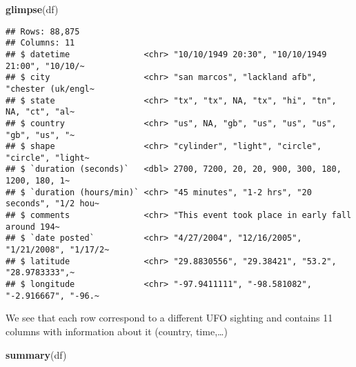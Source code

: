 \documentclass[
]{article}
\newenvironment{Shaded}{\begin{snugshade}}{\end{snugshade}}
\newcommand{\FunctionTok}[1]{\textcolor[rgb]{0.13,0.29,0.53}{\textbf{#1}}}
\newcommand{\NormalTok}[1]{#1}
\begin{document}
\begin{Shaded}
\begin{Highlighting}[]
\FunctionTok{glimpse}\NormalTok{(df)}
\end{Highlighting}
\end{Shaded}

\begin{verbatim}
## Rows: 88,875
## Columns: 11
## $ datetime               <chr> "10/10/1949 20:30", "10/10/1949 21:00", "10/10/~
## $ city                   <chr> "san marcos", "lackland afb", "chester (uk/engl~
## $ state                  <chr> "tx", "tx", NA, "tx", "hi", "tn", NA, "ct", "al~
## $ country                <chr> "us", NA, "gb", "us", "us", "us", "gb", "us", "~
## $ shape                  <chr> "cylinder", "light", "circle", "circle", "light~
## $ `duration (seconds)`   <dbl> 2700, 7200, 20, 20, 900, 300, 180, 1200, 180, 1~
## $ `duration (hours/min)` <chr> "45 minutes", "1-2 hrs", "20 seconds", "1/2 hou~
## $ comments               <chr> "This event took place in early fall around 194~
## $ `date posted`          <chr> "4/27/2004", "12/16/2005", "1/21/2008", "1/17/2~
## $ latitude               <chr> "29.8830556", "29.38421", "53.2", "28.9783333",~
## $ longitude              <chr> "-97.9411111", "-98.581082", "-2.916667", "-96.~
\end{verbatim}

We see that each row correspond to a different UFO sighting and contains
11 columns with information about it (country, time,\ldots)

\begin{Shaded}
\begin{Highlighting}[]
\FunctionTok{summary}\NormalTok{(df)}
\end{Highlighting}
\end{Shaded}
\end{document}
